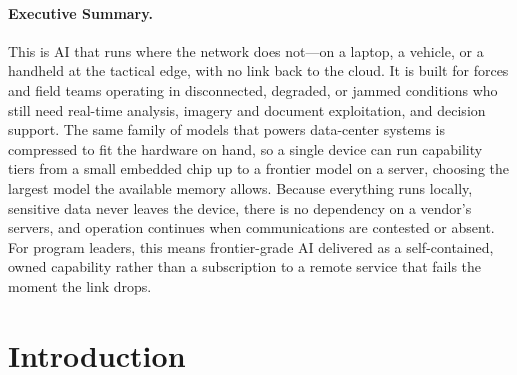 \documentclass[11pt,letterpaper]{article}
\begin{document}
\makecover

\begin{abstract}
We present an edge-deployable AI/ML framework designed for disconnected, degraded, and bandwidth-limited tactical environments. The system combines a Rust-native LLM inference engine supporting 15+ text and 16+ vision model architectures with aggressive quantization (2--8 bit) enabling deployment on hardware ranging from Apple Silicon laptops to embedded ARM processors. A family of 18 frontier models (0.8B--1T+ parameters) provides capability tiers from nano-scale edge inference to frontier reasoning. The ZAP zero-copy binary protocol achieves 11.5M transactions per second for AI agent coordination, while GPU-accelerated operations on Metal and CUDA provide real-time performance for cryptographic and neural network workloads. Multi-agent orchestration with 83 specialized agents enables autonomous analysis with 200--300 sequential tool calls. The framework operates fully offline with local model management, sandboxed execution, and no cloud dependencies.
\end{abstract}

\paragraph{Executive Summary.}
This is AI that runs where the network does not---on a laptop, a vehicle, or a handheld at the tactical edge, with no link back to the cloud. It is built for forces and field teams operating in disconnected, degraded, or jammed conditions who still need real-time analysis, imagery and document exploitation, and decision support. The same family of models that powers data-center systems is compressed to fit the hardware on hand, so a single device can run capability tiers from a small embedded chip up to a frontier model on a server, choosing the largest model the available memory allows. Because everything runs locally, sensitive data never leaves the device, there is no dependency on a vendor's servers, and operation continues when communications are contested or absent. For program leaders, this means frontier-grade AI delivered as a self-contained, owned capability rather than a subscription to a remote service that fails the moment the link drops.

\tableofcontents
\newpage

\section{Introduction}
\end{document}
